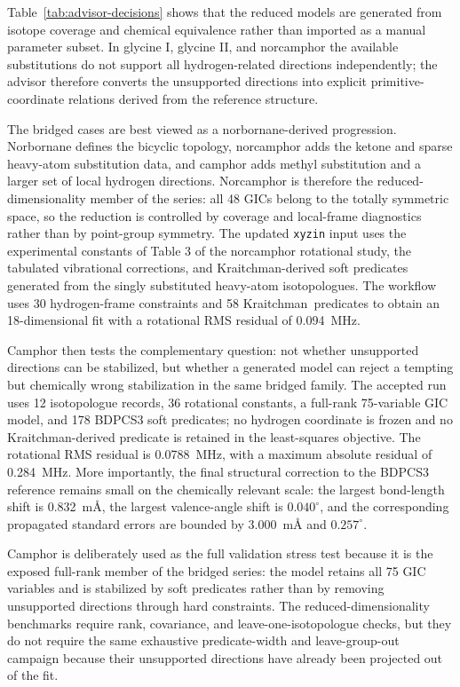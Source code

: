 \documentclass[aip,jcp,reprint,longbibliography,floatfix]{revtex4-2}
\begin{document}
Table~\ref{tab:advisor-decisions} shows that the reduced models are generated
from isotope coverage and chemical equivalence rather than imported as a
manual parameter subset. In glycine I, glycine II, and norcamphor the available
substitutions do not support all hydrogen-related directions independently;
the advisor therefore converts the unsupported directions into explicit
primitive-coordinate relations derived from the reference structure.

The bridged cases are best viewed as a norbornane-derived progression.
Norbornane defines the bicyclic topology, norcamphor adds the ketone and
sparse heavy-atom substitution data, and camphor adds methyl substitution and
a larger set of local hydrogen directions. Norcamphor is therefore the
reduced-dimensionality member of the series: all 48 GICs belong to the
totally symmetric space, so the reduction is controlled by coverage and
local-frame diagnostics rather than by point-group symmetry. The updated
\texttt{xyzin} input uses the experimental constants of Table 3 of the
norcamphor rotational study, the tabulated vibrational corrections, and
Kraitchman-derived soft predicates generated from the singly substituted
heavy-atom isotopologues. The workflow uses 30 hydrogen-frame constraints and
58 \mbox{Kraitchman predicates} to obtain an 18-dimensional fit with a
rotational RMS residual of 0.094~MHz.

Camphor then tests the complementary question: not whether unsupported
directions can be stabilized, but whether a generated model can reject a
tempting but chemically wrong stabilization in the same bridged family. The
accepted run uses 12 isotopologue records, 36 rotational constants, a
full-rank 75-variable GIC model, and 178 BDPCS3 soft predicates; no hydrogen
coordinate is frozen and no Kraitchman-derived predicate is retained in the
least-squares objective. The rotational RMS residual is 0.0788~MHz, with a
maximum absolute residual of 0.284~MHz. More importantly, the final structural
correction to the BDPCS3 reference remains small on the chemically relevant
scale: the largest bond-length shift is 0.832~m\AA{}, the largest
valence-angle shift is $0.040^\circ$, and the corresponding propagated
standard errors are bounded by 3.000~m\AA{} and $0.257^\circ$.

Camphor is deliberately used as the full validation stress test because it is
the exposed full-rank member of the bridged series: the model retains all 75
GIC variables and is stabilized by soft predicates rather than by removing
unsupported directions through hard constraints. The reduced-dimensionality
benchmarks require rank, covariance, and leave-one-isotopologue checks, but
they do not require the same exhaustive predicate-width and leave-group-out
campaign because their unsupported directions have already been projected out
of the fit.
\end{document}
